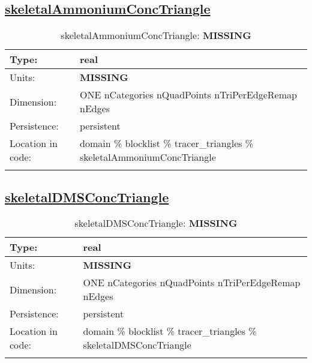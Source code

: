 \subsection[skeletalAmmoniumConcTriangle]{\hyperref[sec:var_tab_tracer_triangles]{skeletalAmmoniumConcTriangle}}
\label{subsec:var_sec_tracer_triangles_skeletalAmmoniumConcTriangle}
\begin{center}
\begin{longtable}{| p{2.0in} | p{4.0in} |}
        \hline 
        Type: & real \\
        \hline 
        Units: & {\bf \color{red} MISSING} \\
        \hline 
        Dimension: & ONE nCategories nQuadPoints nTriPerEdgeRemap nEdges \\
        \hline 
        Persistence: & persistent \\
        \hline 
         Location in code: & domain \% blocklist \% tracer\_triangles \% skeletalAmmoniumConcTriangle \\
         \hline 
    \caption{skeletalAmmoniumConcTriangle: {\bf \color{red} MISSING}}
\end{longtable}
\end{center}
\subsection[skeletalDMSConcTriangle]{\hyperref[sec:var_tab_tracer_triangles]{skeletalDMSConcTriangle}}
\label{subsec:var_sec_tracer_triangles_skeletalDMSConcTriangle}
\begin{center}
\begin{longtable}{| p{2.0in} | p{4.0in} |}
        \hline 
        Type: & real \\
        \hline 
        Units: & {\bf \color{red} MISSING} \\
        \hline 
        Dimension: & ONE nCategories nQuadPoints nTriPerEdgeRemap nEdges \\
        \hline 
        Persistence: & persistent \\
        \hline 
         Location in code: & domain \% blocklist \% tracer\_triangles \% skeletalDMSConcTriangle \\
         \hline 
    \caption{skeletalDMSConcTriangle: {\bf \color{red} MISSING}}
\end{longtable}
\end{center}
